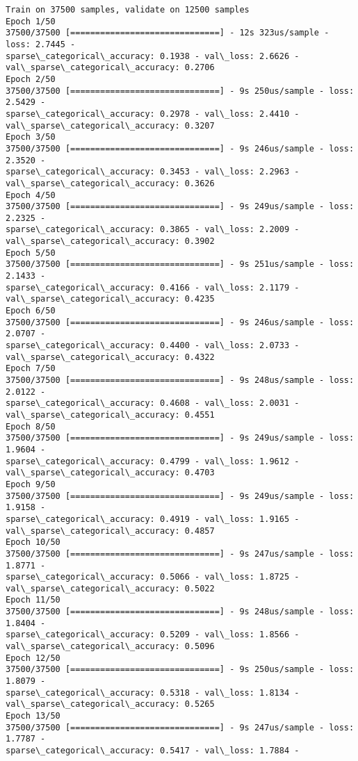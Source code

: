 \documentclass[11pt]{article}
\begin{document}
    \begin{Verbatim}[commandchars=\\\{\}]
Train on 37500 samples, validate on 12500 samples
Epoch 1/50
37500/37500 [==============================] - 12s 323us/sample - loss: 2.7445 -
sparse\_categorical\_accuracy: 0.1938 - val\_loss: 2.6626 -
val\_sparse\_categorical\_accuracy: 0.2706
Epoch 2/50
37500/37500 [==============================] - 9s 250us/sample - loss: 2.5429 -
sparse\_categorical\_accuracy: 0.2978 - val\_loss: 2.4410 -
val\_sparse\_categorical\_accuracy: 0.3207
Epoch 3/50
37500/37500 [==============================] - 9s 246us/sample - loss: 2.3520 -
sparse\_categorical\_accuracy: 0.3453 - val\_loss: 2.2963 -
val\_sparse\_categorical\_accuracy: 0.3626
Epoch 4/50
37500/37500 [==============================] - 9s 249us/sample - loss: 2.2325 -
sparse\_categorical\_accuracy: 0.3865 - val\_loss: 2.2009 -
val\_sparse\_categorical\_accuracy: 0.3902
Epoch 5/50
37500/37500 [==============================] - 9s 251us/sample - loss: 2.1433 -
sparse\_categorical\_accuracy: 0.4166 - val\_loss: 2.1179 -
val\_sparse\_categorical\_accuracy: 0.4235
Epoch 6/50
37500/37500 [==============================] - 9s 246us/sample - loss: 2.0707 -
sparse\_categorical\_accuracy: 0.4400 - val\_loss: 2.0733 -
val\_sparse\_categorical\_accuracy: 0.4322
Epoch 7/50
37500/37500 [==============================] - 9s 248us/sample - loss: 2.0122 -
sparse\_categorical\_accuracy: 0.4608 - val\_loss: 2.0031 -
val\_sparse\_categorical\_accuracy: 0.4551
Epoch 8/50
37500/37500 [==============================] - 9s 249us/sample - loss: 1.9604 -
sparse\_categorical\_accuracy: 0.4799 - val\_loss: 1.9612 -
val\_sparse\_categorical\_accuracy: 0.4703
Epoch 9/50
37500/37500 [==============================] - 9s 249us/sample - loss: 1.9158 -
sparse\_categorical\_accuracy: 0.4919 - val\_loss: 1.9165 -
val\_sparse\_categorical\_accuracy: 0.4857
Epoch 10/50
37500/37500 [==============================] - 9s 247us/sample - loss: 1.8771 -
sparse\_categorical\_accuracy: 0.5066 - val\_loss: 1.8725 -
val\_sparse\_categorical\_accuracy: 0.5022
Epoch 11/50
37500/37500 [==============================] - 9s 248us/sample - loss: 1.8404 -
sparse\_categorical\_accuracy: 0.5209 - val\_loss: 1.8566 -
val\_sparse\_categorical\_accuracy: 0.5096
Epoch 12/50
37500/37500 [==============================] - 9s 250us/sample - loss: 1.8079 -
sparse\_categorical\_accuracy: 0.5318 - val\_loss: 1.8134 -
val\_sparse\_categorical\_accuracy: 0.5265
Epoch 13/50
37500/37500 [==============================] - 9s 247us/sample - loss: 1.7787 -
sparse\_categorical\_accuracy: 0.5417 - val\_loss: 1.7884 -

\end{Verbatim}
\end{document}
